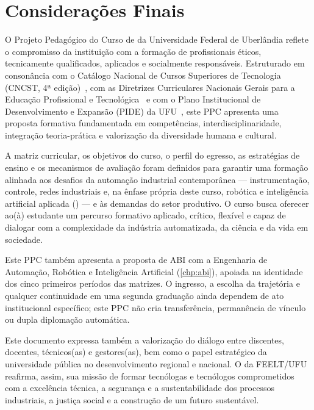 \chapter{Considerações Finais}
\label{chp:consideracoes_finais}

O Projeto Pedagógico do Curso de \ppccurso da Universidade Federal de Uberlândia reflete o compromisso da instituição com a formação de profissionais éticos, tecnicamente qualificados, aplicados e socialmente responsáveis. Estruturado em consonância com o Catálogo Nacional de Cursos Superiores de Tecnologia (CNCST, 4ª edição)~\cite{mec_cncst_2024}, com as Diretrizes Curriculares Nacionais Gerais para a Educação Profissional e Tecnológica~\cite{cne_cp_1_2021} e com o Plano Institucional de Desenvolvimento e Expansão (PIDE) da UFU~\cite{ufu_consun_31_2022}, este PPC apresenta uma proposta formativa fundamentada em competências, interdisciplinaridade, integração teoria-prática e valorização da diversidade humana e cultural.

A matriz curricular, os objetivos do curso, o perfil do egresso, as estratégias de ensino e os mecanismos de avaliação foram definidos para garantir uma formação alinhada aos desafios da automação industrial contemporânea — instrumentação, controle, redes industriais e, na ênfase própria deste curso, robótica e inteligência artificial aplicada (\ppcenfasecurricular) — e às demandas do setor produtivo. O curso busca oferecer ao(à) estudante um percurso formativo aplicado, crítico, flexível e capaz de dialogar com a complexidade da indústria automatizada, da ciência e da vida em sociedade.

Este PPC também apresenta a proposta de ABI com a Engenharia de Automação, Robótica e Inteligência Artificial (\autoref{chp:abi}), apoiada na identidade dos cinco primeiros períodos das matrizes. O ingresso, a escolha da trajetória e qualquer continuidade em uma segunda graduação ainda dependem de ato institucional específico; este PPC não cria transferência, permanência de vínculo ou dupla diplomação automática.

Este documento expressa também a valorização do diálogo entre discentes, docentes, técnicos(as) e gestores(as), bem como o papel estratégico da universidade pública no desenvolvimento regional e nacional. O \ppccurso da FEELT/UFU reafirma, assim, sua missão de formar tecnólogas e tecnólogos comprometidos com a excelência técnica, a segurança e a sustentabilidade dos processos industriais, a justiça social e a construção de um futuro sustentável.
